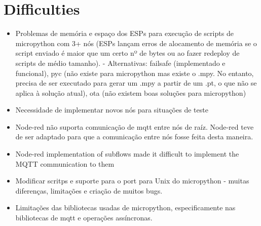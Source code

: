 \section{Difficulties}
\begin{itemize}
    \item Problemas de memória e espaço dos ESPs para execução de scripts de micropython com 3+ nós (ESPs lançam erros de alocamento de memória se o script enviado é maior que um certo nº de bytes ou ao fazer redeploy de scripts de médio tamanho). - Alternativas: failsafe (implementado e funcional), pyc (não existe para micropython mas existe o .mpy. No entanto, precisa de ser executado para gerar um .mpy a partir de um .pt, o que não se aplica à solução atual), ota (não existem boas soluções para micropython)
    \item Necessidade de implementar novos nós para situações de teste
    \item Node-red não suporta comunicação de mqtt entre nós de raíz. Node-red teve de ser adaptado para que a comunicação entre nós fosse feita desta maneira.
    \item Node-red implementation of subflows made it difficult to implement the MQTT communication to them
    \item Modificar scritps e suporte para o port para Unix do micropython - muitas diferenças, limitações e criação de muitos bugs.
    \item Limitações das bibliotecas usadas de micropython, especificamente nas bibliotecas de mqtt e operações assíncronas.
\end{itemize}{}



